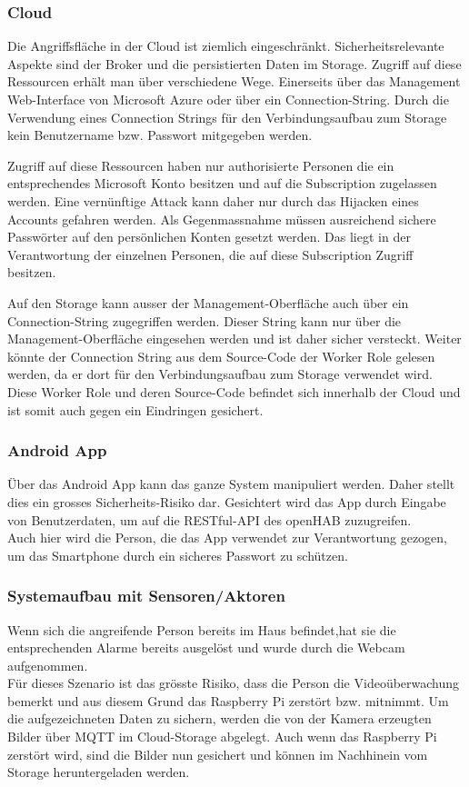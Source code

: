 \subsubsection{Cloud}
Die Angriffsfläche in der Cloud ist ziemlich eingeschränkt. Sicherheitsrelevante Aspekte sind der Broker und die persistierten Daten im Storage. Zugriff auf diese Ressourcen erhält man über verschiedene Wege. Einerseits über das Management Web-Interface von Microsoft Azure oder über ein Connection-String. Durch die Verwendung eines Connection Strings für den Verbindungsaufbau zum Storage kein Benutzername bzw. Passwort mitgegeben werden.

Zugriff auf diese Ressourcen haben nur authorisierte Personen die ein entsprechendes Microsoft Konto besitzen und auf die Subscription zugelassen werden. Eine vernünftige Attack kann daher nur durch das Hijacken eines Accounts gefahren werden. Als Gegenmassnahme müssen ausreichend sichere Passwörter auf den persönlichen Konten gesetzt werden. Das liegt in der Verantwortung der einzelnen Personen, die auf diese Subscription Zugriff besitzen.

Auf den Storage kann ausser der Management-Oberfläche auch über ein Connection-String zugegriffen werden. Dieser String kann nur über die Management-Oberfläche eingesehen werden und ist daher sicher versteckt. Weiter könnte der Connection String aus dem Source-Code der Worker Role gelesen werden, da er dort für den Verbindungsaufbau zum Storage verwendet wird. Diese Worker Role und deren Source-Code befindet sich innerhalb der Cloud und ist somit auch gegen ein Eindringen gesichert. \\

\subsubsection{Android App}
Über das Android App kann das ganze System manipuliert werden. Daher stellt dies ein grosses Sicherheits-Risiko dar. Gesichtert wird das App durch Eingabe von Benutzerdaten, um auf die RESTful-API des openHAB zuzugreifen. \\
Auch hier wird die Person, die das App verwendet zur Verantwortung gezogen, um das Smartphone durch ein sicheres Passwort zu schützen.

\subsubsection{Systemaufbau mit Sensoren/Aktoren}
Wenn sich die angreifende Person bereits im Haus befindet,hat sie die entsprechenden Alarme bereits ausgelöst und wurde durch die Webcam aufgenommen. \\
Für dieses Szenario ist das grösste Risiko, dass die Person die Videoüberwachung bemerkt und aus diesem Grund das Raspberry Pi zerstört bzw. mitnimmt. Um die aufgezeichneten Daten zu sichern, werden die von der Kamera erzeugten Bilder über MQTT im Cloud-Storage abgelegt. Auch wenn das Raspberry Pi zerstört wird, sind die Bilder nun gesichert und können im Nachhinein vom Storage heruntergeladen werden.


